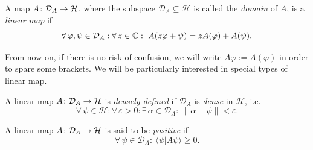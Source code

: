\begin{definition}
A map $A\colon\mathcal{D}_A\to \mathcal{H}$, where the subspace $\mathcal{D}_A\subseteq \mathcal{H}$ is called the \emph{domain} of $A$, is a \emph{linear map} if
\begin{equation*}
\forall \, \varphi,\psi\in\mathcal{D}_A:\forall \, z \in \C : \ A(z\varphi+\psi)=zA(\varphi)+A(\psi).
\end{equation*}
\end{definition}
From now on, if there is no risk of confusion, we will write $A\varphi:=A(\varphi)$ in order to spare some brackets. We will be particularly interested in special types of linear map.




\begin{definition}
A linear map $A\colon\mathcal{D}_A\to \mathcal{H}$ is \emph{densely defined} if $\mathcal{D}_A$ is \emph{dense} in $\mathcal{H}$, i.e.\
\begin{equation*}
\forall \, \psi\in \mathcal{H} : \forall \, \varepsilon >0: \exists \, \alpha \in \mathcal{D}_A  :\ \|\alpha-\psi\|<\varepsilon.
\end{equation*}
\end{definition}

\begin{definition}
A linear map $A\colon\mathcal{D}_A\to \mathcal{H}$ is said to be \emph{positive} if 
\begin{equation*}
\forall \, \psi\in\mathcal{D}_A : \ \langle\psi|A\psi\rangle\geq 0.
\end{equation*}
\end{definition}


